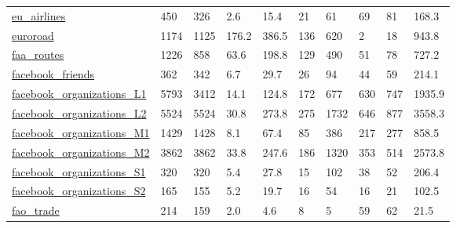 \begin{longtable}{llllllllll}
 \href{https://manliodedomenico.com/data.php}{eu\_airlines}                                                                  & 450        & 326   & 2.6    & 15.4   & 21    & 61     & 69     & 81     & 168.3   \\
 \href{http://konect.cc/networks/subelj_euroroad}{euroroad}                                                                 & 1174       & 1125  & 176.2  & 386.5  & 136   & 620    & 2      & 18     & 943.8   \\
 \href{http://konect.cc/networks/maayan-faa}{faa\_routes}                                                                    & 1226       & 858   & 63.6   & 198.8  & 129   & 490    & 51     & 78     & 727.2   \\
 \href{https://github.com/benmaier/BFMaierFBnetwork}{facebook\_friends}                                                      & 362        & 342   & 6.7    & 29.7   & 26    & 94     & 44     & 59     & 214.1   \\
 \href{https://homes.cs.washington.edu/~fire/}{facebook\_organizations\_L1}                                                   & 5793       & 3412  & 14.1   & 124.8  & 172   & 677    & 630    & 747    & 1935.9  \\
 \href{https://homes.cs.washington.edu/~fire/}{facebook\_organizations\_L2}                                                   & 5524       & 5524  & 30.8   & 273.8  & 275   & 1732   & 646    & 877    & 3558.3  \\
 \href{https://homes.cs.washington.edu/~fire/}{facebook\_organizations\_M1}                                                   & 1429       & 1428  & 8.1    & 67.4   & 85    & 386    & 217    & 277    & 858.5   \\
 \href{https://homes.cs.washington.edu/~fire/}{facebook\_organizations\_M2}                                                   & 3862       & 3862  & 33.8   & 247.6  & 186   & 1320   & 353    & 514    & 2573.8  \\
 \href{https://homes.cs.washington.edu/~fire/}{facebook\_organizations\_S1}                                                   & 320        & 320   & 5.4    & 27.8   & 15    & 102    & 38     & 52     & 206.4   \\
 \href{https://homes.cs.washington.edu/~fire/}{facebook\_organizations\_S2}                                                   & 165        & 155   & 5.2    & 19.7   & 16    & 54     & 16     & 21     & 102.5   \\
 \href{https://manliodedomenico.com/data.php}{fao\_trade}                                                                    & 214        & 159   & 2.0    & 4.6    & 8     & 5      & 59     & 62     & 21.5    \\

\end{longtable}
